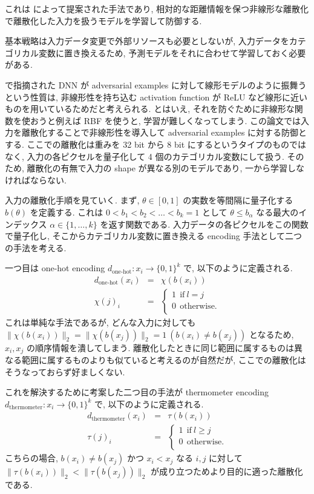 これは \cite{buckman2018thermometer} によって提案された手法であり,  相対的な距離情報を保つ非線形な離散化で離散化した入力を扱うモデルを学習して防御する.

基本戦略は入力データ変更で外部リソースも必要としないが, 入力データをカテゴリカル変数に置き換えるため, 予測モデルをそれに合わせて学習しておく必要がある.

\cite{goodfellow2014explaining} で指摘された DNN が adversarial examples に対して線形モデルのように振舞うという性質は, 非線形性を持ち込む activation function が ReLU など線形に近いものを用いているためだと考えられる.
とはいえ, それを防ぐために非線形な関数を使おうと例えば RBF を使うと, 学習が難しくなってしまう.
この論文では入力を離散化することで非線形性を導入して adversarial examples に対する防御とする.
ここでの離散化は重みを 32 bit から 8 bit にするというタイプのものではなく, 入力の各ピクセルを量子化して 4 個のカテゴリカル変数にして扱う.
そのため, 離散化の有無で入力の shape が異なる別のモデルであり, 一から学習しなければならない.

入力の離散化手順を見ていく.
まず, $\theta \in [0, 1]$ の実数を等間隔に量子化する $b (\theta)$ を定義する.
これは $0 < b_1 < b_2 < \dots < b_k = 1$ として $\theta \leq b_\alpha$ なる最大のインデックス $\alpha \in \{1, \dots, k\}$ を返す関数である.
入力データの各ピクセルをこの関数で量子化し, そこからカテゴリカル変数に置き換える encoding 手法として二つの手法を考える.

一つ目は one-hot encoding $d_{\text{one-hot}}: x_i \rightarrow \{0, 1\}^k$ で, 以下のように定義される.
%
\begin{eqnarray}
d_{\text{one-hot}} (x_i) &=& \chi (b(x_i))\\
\chi (j)_i &=& \left\{ \begin{array}{l}
1 \ \ \text{if} \ l = j \\
0 \ \ \text{otherwise.} \\
\end{array} \right.
\label{eq:thermometer-encoding-onehot}
\end{eqnarray}
%
これは単純な手法であるが, どんな入力に対しても $\|\chi (b(x_i))\|_2  = \|\chi (b(x_j))\|_2 = 1 \ (b(x_i) \neq b(x_j))$ となるため, $x_i, x_j$ の順序情報を潰してしまう.
離散化したときに同じ範囲に属するものは異なる範囲に属するものよりも似ていると考えるのが自然だが, ここでの離散化はそうなっておらず好ましくない.

これを解決するために考案した二つ目の手法が thermometer encoding $d_{\text{thermometer}}: x_i \rightarrow \{0, 1\}^k$ で, 以下のように定義される.
%
\begin{eqnarray}
d_{\text{thermometer}} (x_i) &=& \tau (b(x_i))\\
\tau (j)_i &=& \left\{ \begin{array}{l}
1 \ \ \text{if} \ l \geq j \\
0 \ \ \text{otherwise.} \\
\end{array} \right.
\label{eq:thermometer-encoding-thermometer}
\end{eqnarray}
%
こちらの場合, $b(x_i) \neq b(x_j)$ かつ $x_i < x_j$ なる $i,j$ に対して $\|\tau(b(x_i))\|_2 < \|\tau(b(x_j))\|_2$ が成り立つためより目的に適った離散化である.

